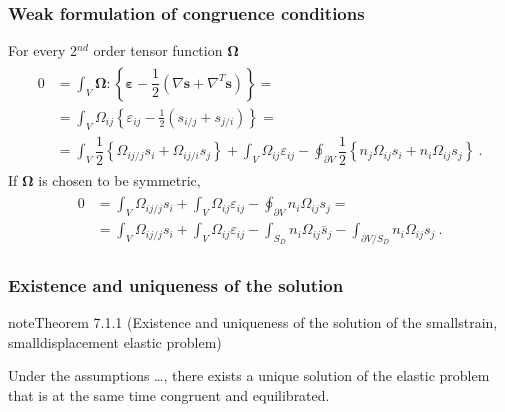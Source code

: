 \documentclass[letterpaper,10pt,english]{jupyterBook}
\begin{document}
\subsubsection{Weak formulation of congruence conditions}
\label{\detokenize{ch/solids/small-displacements-statics-weak-form-3d:weak-formulation-of-congruence-conditions}}\label{\detokenize{ch/solids/small-displacements-statics-weak-form-3d:solid-mechanics-intro-small-displacements-statics-weak-form-weak-congruence}}
\sphinxAtStartPar
For every 2\(^{nd}\) order tensor function \(\boldsymbol\Omega\)
\begin{equation*}
\begin{split}\begin{aligned}
0 & = \int_V \boldsymbol\Omega : \left\{ \boldsymbol\varepsilon - \dfrac{1}{2} \left( \nabla \mathbf{s} + \nabla^T \mathbf{s} \right) \right\} = \\
  & = \int_V \Omega_{ij} \left\{ \varepsilon_{ij} - \frac{1}{2}\left( s_{i/j} + s_{j/i} \right) \right\} = \\
  & = \int_V \dfrac{1}{2} \left\{ \Omega_{ij/j} s_i + \Omega_{ij/i} s_j \right\} + \int_{V} \Omega_{ij} \varepsilon_{ij} - \oint_{\partial V} \dfrac{1}{2} \left\{ n_j \Omega_{ij} s_i + n_i \Omega_{ij} s_j \right\} \ .
\end{aligned}\end{split}
\end{equation*}
\sphinxAtStartPar
If \(\boldsymbol\Omega\) is chosen to be symmetric,
\begin{equation*}
\begin{split}\begin{aligned}
0 & = \int_V \Omega_{ij/j} s_i  + \int_{V} \Omega_{ij} \varepsilon_{ij} - \oint_{\partial V} n_i \Omega_{ij} s_j = \\
  & = \int_V \Omega_{ij/j} s_i  + \int_{V} \Omega_{ij} \varepsilon_{ij} - \int_{S_D} n_i \Omega_{ij} \overline{s}_j - \int_{\partial V / S_D} n_i \Omega_{ij} s_j \ .
\end{aligned}\end{split}
\end{equation*}

\subsubsection{Existence and uniqueness of the solution}
\label{\detokenize{ch/solids/small-displacements-statics-weak-form-3d:existence-and-uniqueness-of-the-solution}}\label{ch/solids/small-displacements-statics-weak-form-3d:theorem-0}
\begin{sphinxadmonition}{note}{Theorem 7.1.1 (Existence and uniqueness of the solution of the small\sphinxhyphen{}strain, small\sphinxhyphen{}displacement elastic problem)}



\sphinxAtStartPar
Under the assumptions …, there exists a unique solution of the elastic problem that is at the same time congruent and equilibrated.
\end{sphinxadmonition}
\end{document}
